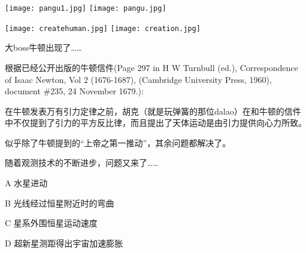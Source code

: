 \documentclass[CJK]{beamer}
\begin{document}
\begin{frame}
\bch

\texttt{[image: pangu1.jpg]}
\emini
{}
\texttt{[image: pangu.jpg]}
\emini

\ech
\end{frame}

\begin{frame}
\bch
\texttt{[image: createhuman.jpg]}
\texttt{[image: creation.jpg]}
\ech
\end{frame}

\begin{frame}
  \bch
  {\Large
  大boss牛顿出现了……}
  \ech
\end{frame}


\begin{frame}
  \bch
  \ech
\end{frame}


\begin{frame}
  \bch
  \ech
\end{frame}

\begin{frame}
  \bch

  根据已经公开出版的牛顿信件{\scriptsize (Page 297 in H W Turnbull (ed.), Correspondence of Isaac Newton, Vol 2 (1676-1687), (Cambridge University Press, 1960), document \#235, 24 November 1679.)}:
  
  {\blue 在牛顿发表万有引力定律之前，胡克（就是玩弹簧的那位dalao）在和牛顿的信件中不仅提到了引力的平方反比律，而且提出了天体运动是由引力提供向心力所致。}

  \ech
\end{frame}

\begin{frame}

  \bch
  似乎除了牛顿提到的“上帝之第一推动”，其余问题都解决了。
  \ech
\end{frame}


\begin{frame}
  \bch
  随着观测技术的不断进步，问题又来了……
  \ech
\end{frame}


\begin{frame}
  \bch
  \emini
  \bitem
\item[A]{水星进动}
\item[B]{光线经过恒星附近时的弯曲}
\item[C]{星系外围恒星运动速度}
\item[D]{超新星测距得出宇宙加速膨胀}
  \eitem
  \emini
  \ech
\end{frame}
\end{document}
